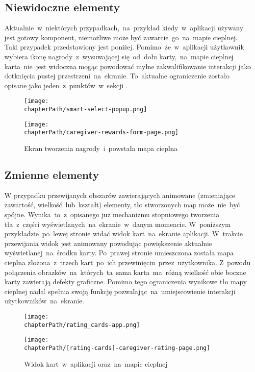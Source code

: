 \subsection{Niewidoczne elementy}
Aktualnie~w~niektórych przypadkach,~na~przykład kiedy~w~aplikacji używany jest gotowy komponent, niemożliwe może być zawarcie~go~na~mapie cieplnej. Taki przypadek przedstawiony jest poniżej. Pomimo~że~w~aplikacji użytkownik wybiera ikonę nagrody~z~wysuwającej się~od~dołu karty,~na~mapie cieplnej karta~nie~jest widoczna mogąc powodować mylne zakwalifikowanie interakcji jako dotknięcia pustej przestrzeni~na~ekranie. To~aktualne ograniczenie zostało opisane jako jeden~z~punktów~w~sekcji .

\bigskip
\begin{figure}[H]
\centering
\begin{minipage}{.3\textwidth}
	\centering
	\texttt{[image: \\chapterPath/smart-select-popup.png]}
\end{minipage}
\begin{minipage}{.3\textwidth}
	\centering
	\texttt{[image: \\chapterPath/caregiver-rewards-form-page.png]}
\end{minipage}
\bigskip
\caption{Ekran tworzenia nagrody~i~powstała mapa cieplna}
\label{fig:rs_reward_form}
\end{figure}

\subsection{Zmienne elementy}
W przypadku przewijanych obszarów zawierających animowane (zmieniające zawartość, wielkość~lub~kształt) elementy, tło stworzonych map może~nie~być spójne. Wynika~to~z~opisanego już mechanizmu stopniowego tworzenia tła~z~części wyświetlanych~na~ekranie~w~danym momencie. W~poniższym przykładzie~po~lewej stronie widać widok kart~na~ekranie aplikacji. W~trakcie przewijania widok jest animowany powodując powiększenie aktualnie wyświetlanej~na~środku karty. Po~prawej stronie umieszczona została mapa cieplna złożona~z~trzech kart~po~ich przewinięciu~przez~użytkownika. Z~powodu połączenia obrazków~na~których~ta~sama karta~ma~różną wielkość obie boczne karty zawierają defekty graficzne. Pomimo tego ograniczenia wynikowe tło mapy cieplnej nadal spełnia swoją funkcję pozwalając~na~umiejscowienie interakcji użytkowników~na~ekranie.

\bigskip
\begin{figure}[H]
\begin{minipage}{.25\textwidth}
	\centering
	\texttt{[image: \\chapterPath/rating\_cards-app.png]}
\end{minipage}
\begin{minipage}{.74\textwidth}
	\centering
	\texttt{[image: \\chapterPath/[rating-cards]-caregiver-rating-page.png]}
\end{minipage}
\bigskip
\caption{Widok kart~w~aplikacji oraz~na~mapie cieplnej}
\label{fig:rs_rating_cards}
\end{figure}
